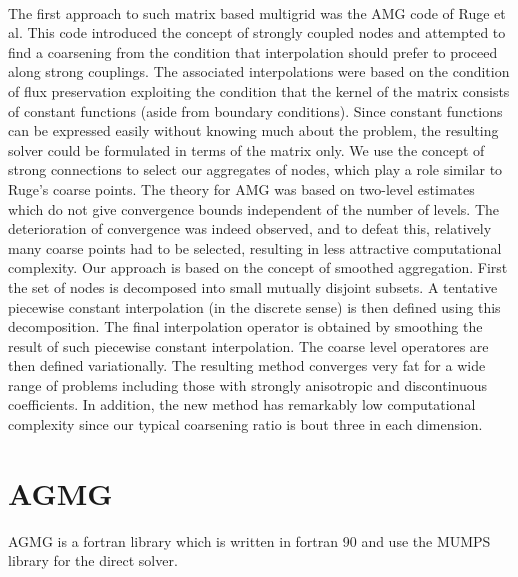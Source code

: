 \\
The first approach to such matrix based multigrid was the AMG code of Ruge et
al. This code introduced the concept of strongly coupled nodes and attempted
to find a coarsening from the condition that interpolation should prefer to
proceed along strong couplings. The associated interpolations were based on
the condition of flux preservation exploiting the condition that the kernel of
the matrix consists of constant functions (aside from boundary conditions).
Since constant functions can be expressed easily without knowing much about
the problem, the resulting solver could be formulated in terms of the matrix
only. We use the concept of strong connections to select our aggregates of
nodes, which play a role similar to Ruge's coarse points. The theory for AMG
was based on two-level estimates which do not give convergence bounds
independent of the number of levels. The deterioration of convergence was
indeed observed, and to defeat this, relatively many coarse points had to be
selected, resulting in less attractive computational complexity. Our approach
is based on the concept of smoothed aggregation. First the set of nodes is
decomposed into small mutually disjoint subsets. A tentative piecewise
constant interpolation (in the discrete sense) is then defined using this
decomposition. The final interpolation operator is obtained by smoothing the
result of such piecewise constant interpolation. The coarse level operatores
are then defined variationally. The resulting method converges very fat for a
wide range of problems including those with strongly anisotropic and
discontinuous coefficients. In addition, the new method has remarkably low
computational complexity since our typical coarsening ratio is bout three in
each dimension.

\section{AGMG \cite{agmg_guide}}
AGMG is a fortran library which is written in fortran 90 and use the MUMPS
library for the direct solver.

